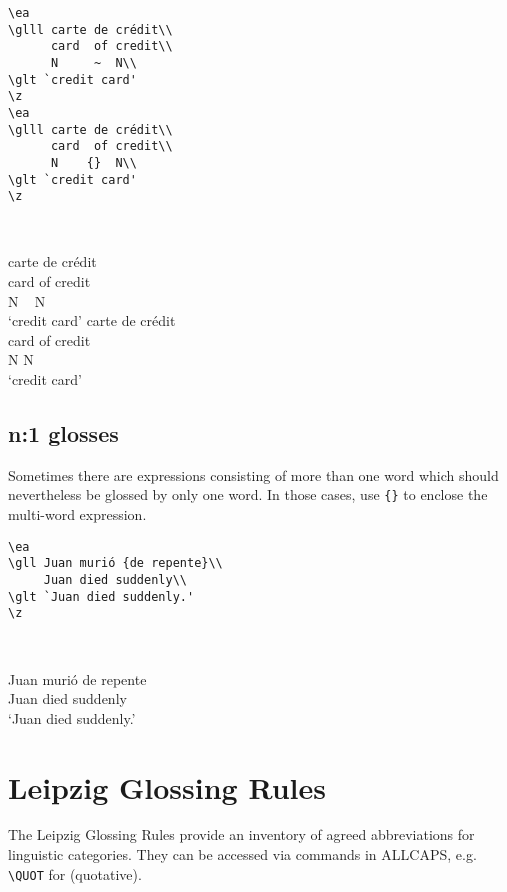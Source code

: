 \documentclass[output=paper]{langscibook}
\newcommand{\cmd}[1]{\texttt{\textbackslash#1}}
\begin{document}
\begin{minipage}[t]{.55\textwidth}
\begin{lstlisting}
\ea
\glll carte de crédit\\
      card  of credit\\
      N     ~  N\\
\glt `credit card'
\z
\ea
\glll carte de crédit\\
      card  of credit\\
      N    {}  N\\
\glt `credit card'
\z
 \end{lstlisting}
\end{minipage}~
\parbox[t]{.45\textwidth}{
\ea
\glll carte de crédit\\
      card  of credit\\
      N     ~  N\\
\glt `credit card'
\z
\ea
\glll carte de crédit\\
      card  of credit\\
      N    {}  N\\
\glt `credit card'
\z
}


\subsection{n:1 glosses}\label{sec:n1glosses}
Sometimes there are expressions consisting of more than one word which should nevertheless be glossed by only one word. In those cases, use \texttt{\{\}} to enclose the multi-word expression.


\begin{minipage}[t]{.55\textwidth}
\begin{lstlisting}
\ea
\gll Juan murió {de repente}\\
     Juan died suddenly\\
\glt `Juan died suddenly.'
\z
 \end{lstlisting}
\end{minipage}~
\parbox[t]{.45\textwidth}{
\ea
\gll Juan murió {de repente}\\
     Juan died suddenly\\
\glt `Juan died suddenly.'
\z
}

\section{Leipzig Glossing Rules}
The Leipzig Glossing Rules provide an inventory of agreed abbreviations for linguistic categories. They can be accessed via commands in ALLCAPS, e.g. \cmd{QUOT} for {\QUOT} (quotative).
\end{document}
